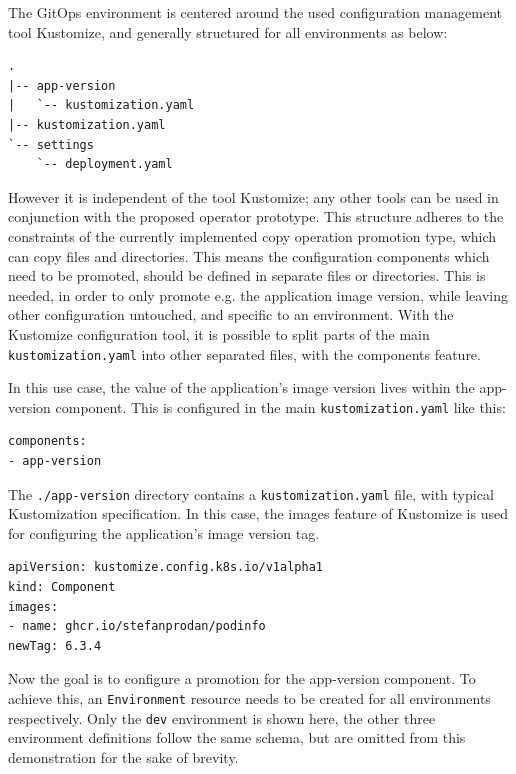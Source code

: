 The GitOps environment is centered around the used configuration management tool
Kustomize, and generally structured for all environments as below:

\begin{lstlisting}
.
|-- app-version
|   `-- kustomization.yaml
|-- kustomization.yaml
`-- settings
    `-- deployment.yaml
\end{lstlisting}

However it is independent of the tool Kustomize;
any other tools can be used in conjunction with the proposed operator prototype.
This structure adheres to the constraints of the currently implemented
copy operation promotion type, which can copy files and directories.
This means the configuration components which need to be promoted,
should be defined in separate files or directories.
This is needed, in order to only promote e.g. the application image version,
while leaving other configuration untouched, and specific to an environment.
With the Kustomize configuration tool, it is possible to split
parts of the main \lstinline|kustomization.yaml| into other separated files,
with the components feature.

In this use case, the value of the application's image version lives within the 
app-version component. This is configured in the main \lstinline|kustomization.yaml|
like this:

\begin{lstlisting}
components:
- app-version
\end{lstlisting}

The \lstinline|./app-version| directory contains a \lstinline|kustomization.yaml| file,
with typical Kustomization specification.
In this case, the images feature of Kustomize is used for configuring the application's
image version tag.

\newpage

\begin{lstlisting}
apiVersion: kustomize.config.k8s.io/v1alpha1
kind: Component
images:
- name: ghcr.io/stefanprodan/podinfo
newTag: 6.3.4
\end{lstlisting}

Now the goal is to configure a promotion for the app-version component.
To achieve this, 
an \lstinline|Environment| resource needs to be created
for all environments respectively.
Only the \lstinline|dev| environment is shown here,
the other three environment definitions follow the same schema,
but are omitted from this demonstration for the sake of brevity.

